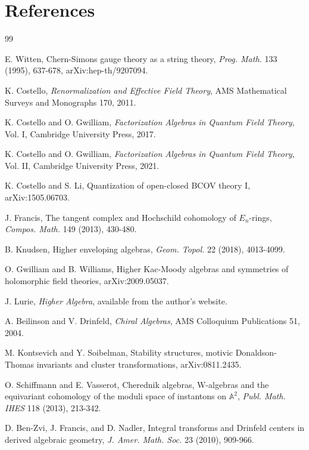 \documentclass[11pt]{amsart}
\theoremstyle{plain}
\theoremstyle{definition}
\theoremstyle{remark}
\begin{document}
\section{References}
\label{sec:references}

\begin{thebibliography}{99}

E. Witten, Chern-Simons gauge theory as a string theory,
\emph{Prog. Math.} 133 (1995), 637-678, arXiv:hep-th/9207094.

K. Costello, \emph{Renormalization and Effective Field Theory},
AMS Mathematical Surveys and Monographs 170, 2011.

K. Costello and O. Gwilliam, \emph{Factorization Algebras in Quantum
Field Theory}, Vol. I, Cambridge University Press, 2017.

K. Costello and O. Gwilliam, \emph{Factorization Algebras in Quantum
Field Theory}, Vol. II, Cambridge University Press, 2021.

K. Costello and S. Li, Quantization of open-closed BCOV theory I,
arXiv:1505.06703.

J. Francis, The tangent complex and Hochschild cohomology of
\(E_n\)-rings, \emph{Compos. Math.} 149 (2013), 430-480.

B. Knudsen, Higher enveloping algebras,
\emph{Geom. Topol.} 22 (2018), 4013-4099.

O. Gwilliam and B. Williams, Higher Kac-Moody algebras and symmetries
of holomorphic field theories, arXiv:2009.05037.

J. Lurie, \emph{Higher Algebra}, available from the author's website.

A. Beilinson and V. Drinfeld, \emph{Chiral Algebras}, AMS Colloquium
Publications 51, 2004.

M. Kontsevich and Y. Soibelman, Stability structures, motivic
Donaldson-Thomas invariants and cluster transformations, arXiv:0811.2435.

O. Schiffmann and E. Vasserot, Cherednik algebras, W-algebras and the
equivariant cohomology of the moduli space of instantons on
\(\mathbb A^2\), \emph{Publ. Math. IHES} 118 (2013), 213-342.

D. Ben-Zvi, J. Francis, and D. Nadler, Integral transforms and
Drinfeld centers in derived algebraic geometry,
\emph{J. Amer. Math. Soc.} 23 (2010), 909-966.

\end{thebibliography}
\end{document}
